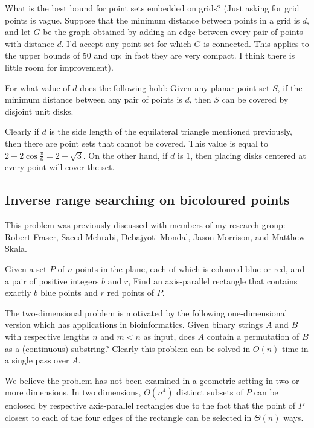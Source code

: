 \documentclass{patmorin}
\newcommand{\poser}[1]{\noindent{\textit{#1}}}
\begin{document}
\begin{op}
  What is the best bound for point sets embedded on grids?
  (Just asking for grid points is vague.  Suppose that the minimum distance
  between points in a grid is $d$, and let $G$ be the graph obtained
  by adding an edge between every pair of points with distance $d$.
  I'd accept any point set for which $G$ is connected.  This applies to
  the upper bounds of 50 and up; in fact they are very compact.  I  think
  there is little room for improvement).
\end{op}

\begin{op}
  For what value of $d$ does the following hold: Given any planar point
  set $S$, if the minimum distance between any pair of points is $d$,
  then $S$ can be covered by disjoint unit disks.
\end{op}

Clearly if $d$ is  the side length of the equilateral triangle mentioned
previously, then there are point sets that cannot be covered.   This value
is equal to $2-2\cos\frac{\pi}{6} = 2{-}\sqrt{3}$.  On the other hand, if
$d$ is $1$, then placing disks centered at every point will cover the set.

\subsection{Inverse range searching on bicoloured points}

\poser{Stephane Durocher}

This problem was previously discussed with members of my research group:
Robert Fraser, Saeed Mehrabi, Debajyoti Mondal, Jason Morrison, 
and Matthew Skala.

\begin{op}
  Given a set $P$ of $n$ points in the plane, each of which is coloured
  blue or red, and a pair of positive integers $b$ and $r$, Find an
  axis-parallel rectangle that contains exactly $b$ blue points and $r$
  red points of $P$.
\end{op}

The two-dimensional problem is motivated by the following one-dimensional
version which has applications in bioinformatics.  Given binary strings
$A$ and $B$ with respective lengths $n$ and $m < n$ as input, does $A$
contain a permutation of $B$ as a (continuous) substring?  Clearly this
problem can be solved in $O(n)$ time in a single pass over $A$.

We believe the problem has not been examined in a geometric setting
in two or more dimensions.  In two dimensions, $\Theta(n^4)$ distinct
subsets of $P$ can be enclosed by respective axis-parallel rectangles
due to the fact that the point of $P$ closest to each of the four edges
of the rectangle can be selected in $\Theta(n)$ ways.
\end{document}
